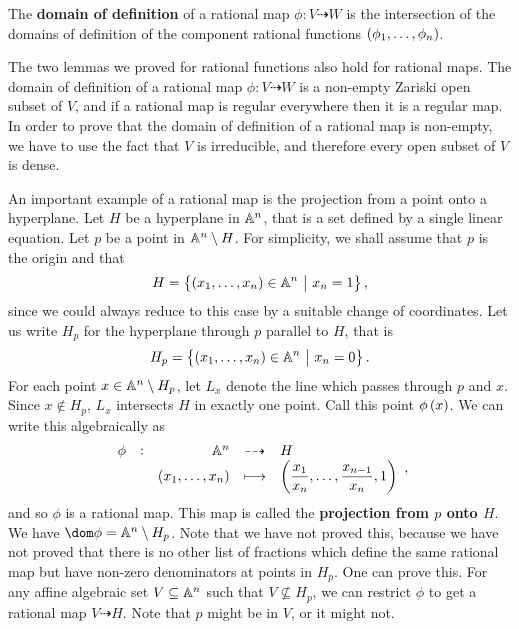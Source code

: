 \begin{definition*}
The \textbf{domain of definition} of a rational map $ \phi : V \dashrightarrow W $ is the intersection of the domains of definition of the component rational functions $ \br{\phi_1, \dots, \phi_n} $.
\end{definition*}

The two lemmas we proved for rational functions also hold for rational maps. The domain of definition of a rational map $ \phi : V \dashrightarrow W $ is a non-empty Zariski open subset of $ V $, and if a rational map is regular everywhere then it is a regular map. In order to prove that the domain of definition of a rational map is non-empty, we have to use the fact that $ V $ is irreducible, and therefore every open subset of $ V $ is dense.

\begin{example*}
An important example of a rational map is the projection from a point onto a hyperplane. Let $ H $ be a hyperplane in $ \AA^n $, that is a set defined by a single linear equation. Let $ p $ be a point in $ \AA^n \setminus H $. For simplicity, we shall assume that $ p $ is the origin and that
$$ H = \cbr{\br{x_1, \dots, x_n} \in \AA^n \st x_n = 1}, $$
since we could always reduce to this case by a suitable change of coordinates. Let us write $ H_p $ for the hyperplane through $ p $ parallel to $ H $, that is
$$ H_p = \cbr{\br{x_1, \dots, x_n} \in \AA^n \st x_n = 0}. $$
For each point $ x \in \AA^n \setminus H_p $, let $ L_x $ denote the line which passes through $ p $ and $ x $. Since $ x \notin H_p $, $ L_x $ intersects $ H $ in exactly one point. Call this point $ \phi\br{x} $. We can write this algebraically as
$$ \rational[\phi]{\AA^n}{H}{\br{x_1, \dots, x_n}}{\br{\dfrac{x_1}{x_n}, \dots, \dfrac{x_{n - 1}}{x_n}, 1}}, $$
and so $ \phi $ is a rational map. This map is called the \textbf{projection from $ p $ onto $ H $}. We have $ \dom \phi = \AA^n \setminus H_p $. Note that we have not proved this, because we have not proved that there is no other list of fractions which define the same rational map but have non-zero denominators at points in $ H_p $. One can prove this. For any affine algebraic set $ V \subseteq \AA^n $ such that $ V \not\subseteq H_p $, we can restrict $ \phi $ to get a rational map $ V \dashrightarrow H $. Note that $ p $ might be in $ V $, or it might not.
\end{example*}

\pagebreak

